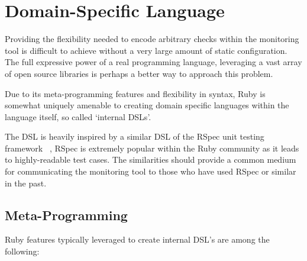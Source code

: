 \documentclass{cshonours}
\begin{document}
\pagebreak
\section{Domain-Specific Language}

Providing the flexibility needed to encode arbitrary checks within the monitoring tool is difficult to achieve without a very large amount of static configuration. The full expressive power of a real programming language, leveraging a vast array of open source libraries is perhaps a better way to approach this problem.

Due to its meta-programming features and flexibility in syntax, Ruby is somewhat uniquely amenable to creating domain specific languages within the language itself, so called `internal DSLs'.

The DSL is heavily inspired by a similar DSL of the RSpec unit testing framework ~\cite{RSpec}, RSpec is extremely popular within the Ruby community as it leads to highly-readable test cases. The similarities should provide a common medium for communicating the monitoring tool to those who have used RSpec or similar in the past.

\subsection{Meta-Programming}

Ruby features typically leveraged to create internal DSL's are among the following:
\end{document}

